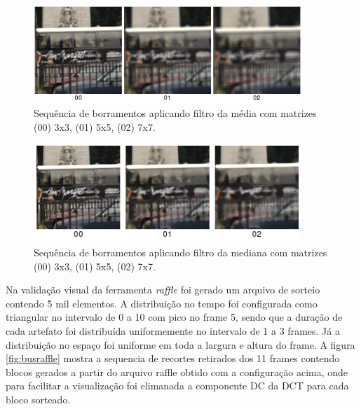 \begin{figure}[!htb]
	\centering
	\includegraphics[width=0.9\textwidth]{./imgs/bluraverage.png}
	\caption{Sequência de borramentos aplicando filtro da média com matrizes (00) 3x3, (01) 5x5, (02) 7x7.}
	\label{fig:bluraverage}
\end{figure}

\begin{figure}[!htb]
	\centering
	\includegraphics[width=0.9\textwidth]{./imgs/blurmedian.png}
	\caption{Sequência de borramentos aplicando filtro da mediana com matrizes (00) 3x3, (01) 5x5, (02) 7x7.}
	\label{fig:blurmedian}
\end{figure}

Na validação visual da ferramenta \emph{raffle} foi gerado um arquivo de sorteio contendo 5 mil elementos.
A distribuição no tempo foi configurada como triangular no intervalo de 0 a 10 com pico no frame 5, sendo que a duração de cada artefato foi distribuída uniformemente no intervalo de 1 a 3 frames.
Já a distribuição no espaço foi uniforme em toda a largura e altura do frame. 
A figura \ref{fig:busraffle} mostra a sequencia de recortes retirados dos 11 frames contendo blocos gerados a partir do arquivo raffle obtido com a configuração acima, onde para facilitar a visualização foi elimanada a componente DC da DCT para cada bloco sorteado.

